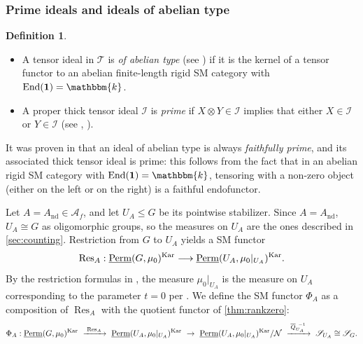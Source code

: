 \documentclass[11pt,a4paper]{amsart}
\theoremstyle{plain}%
\theoremstyle{definition}
\newtheorem{definition}[lemma]{Definition}
\theoremstyle{remark}
\newcommand{\Res}{\operatorname{Res}}
\newcommand{\End}{\operatorname{End}}
\newcommand{\Perm}{\underline{{\rm Perm}}}
\newcommand{\kk}{\mathbbm{k}}
\newcommand{\one}{{\mathbf{1}}}
\newcommand{\Kar}{\mathrm{Kar}}
\newcommand{\I}{\mathcal{I}}
\newcommand{\nd}{\mathrm{nd}}
\begin{document}

\subsubsection{Prime ideals and ideals of abelian type}\label{sec:abelian_ideals}


\begin{definition} 
\mbox{}

\begin{itemize}[itemindent=0pt,leftmargin=*]
    \item A tensor ideal in $\mathcal{T}$ is \emph{of abelian type} (see \cite[Definition 2.1.1]{CEO-abelian}) if it is the kernel of a tensor functor to an abelian finite-length rigid SM category with $\End(\one) = \kk$.
\item A proper thick tensor ideal $\I$ is \emph{prime} if $X\otimes Y \in \I$ implies that either $X \in\I$ or $Y \in \I$ (see \cite{Balmer}, \cite[Section 1.2.1]{CEO-abelian}).   
\end{itemize} 
\end{definition}

It was proven in \cite[Proposition 2.1.3]{CEO-abelian} that an ideal of abelian type is always \emph{faithfully prime}, and its associated thick tensor ideal is prime: this follows from the fact that in an abelian rigid SM category with $\End(\one) = \kk$, tensoring with a non-zero object (either on the left or on the right) is a faithful endofunctor.

\medskip

Let $A=A_{\nd} \in \mathcal{A}_f$, and let $U_A\leq G$ be its pointwise stabilizer. Since $A=A_{\nd}$, $U_A\cong G$ as oligomorphic groups, so the measures on $U_A$ are the ones described in \cref{sec:counting}. Restriction from $G$ to $U_A$ yields a SM functor
\[
 \Res_A:\Perm(G, \mu_0)^{\Kar}\longrightarrow \Perm(U_A,\mu_0|_{U_A})^{\Kar}.
\]
By the restriction formulas in \cite{HS-classical}, the measure $\mu_0|_{U_A}$ is the measure on $U_A$ corresponding to the parameter $t=0$ per \cite[§§6.7, 8.5, 9.6, 10.4, respectively]{HS-classical}. We define the SM functor $\Phi_A$ as a composition of $\Res_A$ with the quotient functor of \cref{thm:rankzero}: 
\[
 \Phi_A:\Perm(G, \mu_0)^{\Kar} ~\xrightarrow{\;\Res_A\;}~
 \Perm(U_A,\mu_0|_{U_A})^{\Kar}~\rightarrow~
 \Perm(U_A,\mu_0|_{U_A})^{\Kar}/\mathcal{N}~\xrightarrow{\;\overline{Q}_{U_A}^{~-1}\;} ~\mathscr S_{U_A}\cong \mathscr S_{G}.
\]
\end{document}

